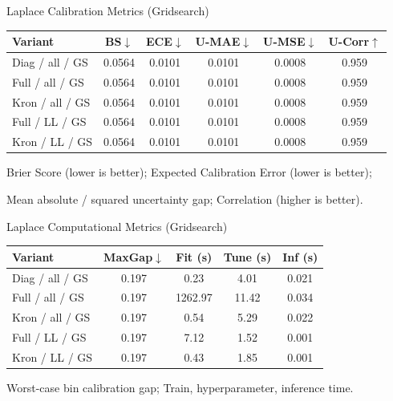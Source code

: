 \documentclass{beamer}
\begin{document}
\begin{frame}{Laplace Calibration Metrics (Gridsearch)}
\begin{threeparttable}
\centering
\small
\begin{tabular}{lccccc}
\toprule
\textbf{Variant} & \textbf{BS$\downarrow$} & \textbf{ECE$\downarrow$} & \textbf{U-MAE$\downarrow$} & \textbf{U-MSE$\downarrow$} & \textbf{U-Corr$\uparrow$} \\
\midrule
Diag / all / GS & 0.0564 & 0.0101 & 0.0101 & 0.0008 & 0.959 \\
Full / all / GS & 0.0564 & 0.0101 & 0.0101 & 0.0008 & 0.959 \\
Kron / all / GS & 0.0564 & 0.0101 & 0.0101 & 0.0008 & 0.959 \\
Full / LL / GS & 0.0564 & 0.0101 & 0.0101 & 0.0008 & 0.959 \\
Kron / LL / GS & 0.0564 & 0.0101 & 0.0101 & 0.0008 & 0.959 \\
\bottomrule
\end{tabular}
\begin{tablenotes}
\small
\item[BS] Brier Score (lower is better); \;[ECE] Expected Calibration Error (lower is better);
\item[U-MAE / MSE] Mean absolute / squared uncertainty gap; \;[U-Corr] Correlation (higher is better).
\end{tablenotes}
\end{threeparttable}
\end{frame}

\begin{frame}{Laplace Computational Metrics (Gridsearch)}
\begin{threeparttable}
\centering
\small
\begin{tabular}{lcccc}
\toprule
\textbf{Variant} & \textbf{MaxGap$\downarrow$} & \textbf{Fit (s)} & \textbf{Tune (s)} & \textbf{Inf (s)} \\
\midrule
Diag / all / GS & 0.197 & 0.23 & 4.01 & 0.021 \\
Full / all / GS & 0.197 & 1262.97 & 11.42 & 0.034 \\
Kron / all / GS & 0.197 & 0.54 & 5.29 & 0.022 \\
Full / LL / GS & 0.197 & 7.12 & 1.52 & 0.001 \\
Kron / LL / GS & 0.197 & 0.43 & 1.85 & 0.001 \\
\bottomrule
\end{tabular}
\begin{tablenotes}
\small
\item[MaxGap] Worst-case bin calibration gap;  Train, hyperparameter, inference time.
\end{tablenotes}
\end{threeparttable}
\end{frame}
\end{document}
